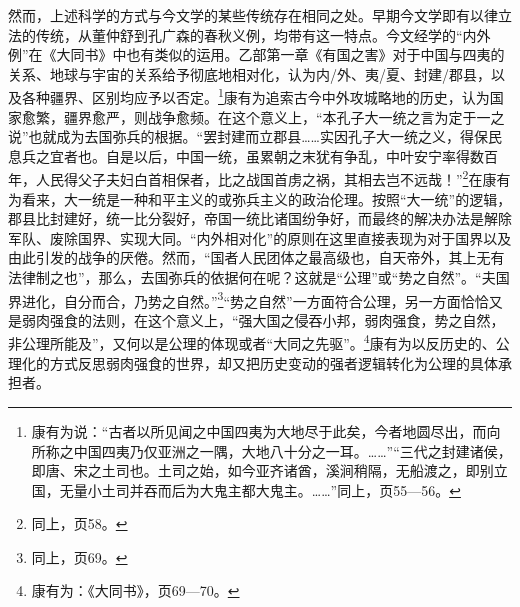 \documentclass[a4paper, 12pt, openright]{ctexbook}
\begin{document}
然而，上述科学的方式与今文学的某些传统存在相同之处。早期今文学即有以律立法的传统，从董仲舒到孔广森的春秋义例，均带有这一特点。今文经学的“内外例”在《大同书》中也有类似的运用。乙部第一章《有国之害》对于中国与四夷的关系、地球与宇宙的关系给予彻底地相对化，认为内/外、夷/夏、封建/郡县，以及各种疆界、区别均应予以否定。\footnote{康有为说：“古者以所见闻之中国四夷为大地尽于此矣，今者地圆尽出，而向所称之中国四夷乃仅亚洲之一隅，大地八十分之一耳。……”“三代之封建诸侯，即唐、宋之土司也。土司之始，如今亚齐诸酋，溪涧稍隔，无船渡之，即别立国，无量小土司并吞而后为大鬼主都大鬼主。……”同上，页55—56。}康有为追索古今中外攻城略地的历史，认为国家愈繁，疆界愈严，则战争愈频。在这个意义上，“本孔子大一统之言为定于一之说”也就成为去国弥兵的根据。“罢封建而立郡县……实因孔子大一统之义，得保民息兵之宜者也。自是以后，中国一统，虽累朝之末犹有争乱，中叶安宁率得数百年，人民得父子夫妇白首相保者，比之战国首虏之祸，其相去岂不远哉！”\footnote{同上，页58。}在康有为看来，大一统是一种和平主义的或弥兵主义的政治伦理。按照“大一统”的逻辑，郡县比封建好，统一比分裂好，帝国一统比诸国纷争好，而最终的解决办法是解除军队、废除国界、实现大同。“内外相对化”的原则在这里直接表现为对于国界以及由此引发的战争的厌倦。然而，“国者人民团体之最高级也，自天帝外，其上无有法律制之也”，那么，去国弥兵的依据何在呢？这就是“公理”或“势之自然”。“夫国界进化，自分而合，乃势之自然。”\footnote{同上，页69。}“势之自然”一方面符合公理，另一方面恰恰又是弱肉强食的法则，在这个意义上，“强大国之侵吞小邦，弱肉强食，势之自然，非公理所能及”，又何以是公理的体现或者“大同之先驱”。\footnote{康有为：《大同书》，页69—70。}康有为以反历史的、公理化的方式反思弱肉强食的世界，却又把历史变动的强者逻辑转化为公理的具体承担者。
\end{document}
